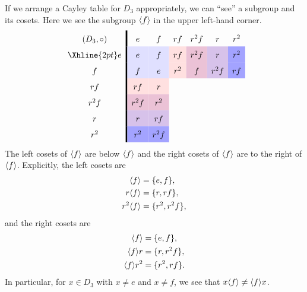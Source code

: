 \documentclass{ximera}
\begin{document}
\begin{example}
  If we arrange a Cayley table for $D_3$ appropriately, we can ``see''
  a subgroup and its cosets. Here we see the subgroup $\langle f\rangle$ in the
  upper left-hand corner.
    \[
    \renewcommand{\arraystretch}{1.6}
    \begin{array}{c!{\vline width 2pt}cccccc}
      (D_3,\circ)& e                         & f                              & rf                            & r^2f                             & r                                    & r^2  \\  \Xhline{2pt}
      e          & e\cellcolor{blue!12!white}     & f\cellcolor{blue!12!white}    & rf\cellcolor{red!12!white}   & r^2f \cellcolor{blue!33!red!24!white}     & r  \cellcolor{blue!66!red!24!white}   & r^2 \cellcolor{blue!36!white} \\  
      f                & f\cellcolor{blue!12!white}    & e\cellcolor{blue!12!white}   & r^2 \cellcolor{red!12!white}    & f\cellcolor{blue!33!red!24!white} & r^2f \cellcolor{blue!66!red!24!white}    & rf \cellcolor{blue!36!white}   \\  
      rf                & rf\cellcolor{red!12!white}   & r\cellcolor{red!12!white}     &    &    &  &     \\  
      r^2f       & r^2f \cellcolor{blue!33!red!24!white}   & r^2 \cellcolor{blue!33!red!24!white}   &   &      &   &   \\  
      r      & r \cellcolor{blue!66!red!24!white}   & rf \cellcolor{blue!66!red!24!white} &    &   &      &     \\  
      r^2       & r^2 \cellcolor{blue!36!white} & r^2f \cellcolor{blue!36!white}    &   &    &     &      \\  
    \end{array}
    \]
    The left cosets of $\langle f\rangle$ are below $\langle f\rangle$ and the right cosets
    of $\langle f\rangle$ are to the right of $\langle f\rangle$. Explicitly, the left
    cosets are
    \begin{align*}
      \langle f\rangle &= \{e, f\},\\
      r\langle f\rangle &= \{r, rf\},\\
      r^2\langle f\rangle &= \{r^2, r^2f\},
    \end{align*}
    and the right cosets are
    \begin{align*}
      \langle f\rangle &= \{e, f\},\\
      \langle f\rangle r &= \{r, r^2f\},\\
      \langle f\rangle r^2&= \{r^2, rf\}.
    \end{align*}
    In particular, for $x\in D_3$ with $x\ne e$ and $x\ne f$, we see
    that $x\langle f\rangle \ne \langle f\rangle x$.
\end{example}
\end{document}
